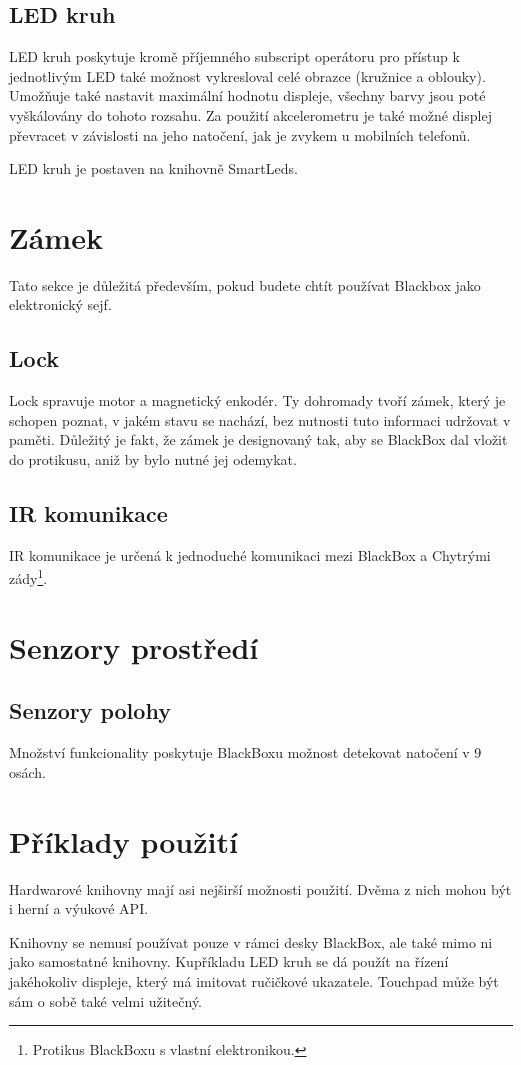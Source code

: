 \subsection{LED kruh}

LED kruh poskytuje kromě příjemného subscript operátoru pro přístup k jednotlivým LED také možnost vykresloval celé obrazce (kružnice a oblouky).
Umožňuje také nastavit maximální hodnotu displeje, všechny barvy jsou poté vyškálovány do tohoto rozsahu.
Za použití akcelerometru je také možné displej převracet v závislosti na jeho natočení, jak je zvykem u mobilních telefonů.

LED kruh je postaven na knihovně SmartLeds\cite{SmartLeds}.

\section{Zámek}

Tato sekce je důležitá především, pokud budete chtít používat Blackbox jako elektronický sejf.

\subsection{Lock}

Lock spravuje motor a magnetický enkodér.
Ty dohromady tvoří zámek, který je schopen poznat, v jakém stavu se nachází, bez nutnosti tuto informaci udržovat v paměti.
Důležitý je fakt, že zámek je designovaný tak, aby se BlackBox dal vložit do protikusu, aniž by bylo nutné jej odemykat.

\subsection{IR komunikace}

IR komunikace je určená k jednoduché komunikaci mezi BlackBox a Chytrými zády\footnote{Protikus BlackBoxu s vlastní elektronikou.}.


\section{Senzory prostředí}

\subsection{Senzory polohy}

Množství funkcionality poskytuje BlackBoxu možnost detekovat natočení v 9 osách. %

\section{Příklady použití}

Hardwarové knihovny mají asi nejširší možnosti použití.
Dvěma z nich mohou být i herní a výukové API.

Knihovny se nemusí používat pouze v rámci desky BlackBox, ale také mimo ni jako samostatné knihovny.
Kupříkladu LED kruh se dá použít na řízení jakéhokoliv displeje, který má imitovat ručičkové ukazatele.
Touchpad může být sám o sobě také velmi užitečný.
